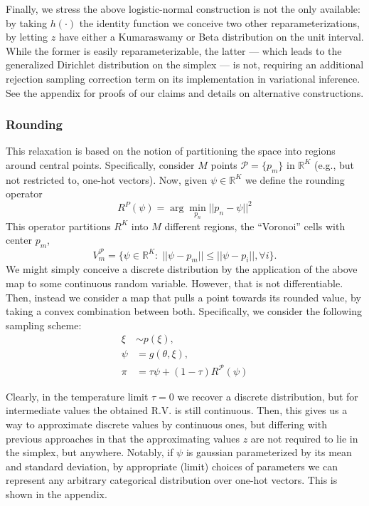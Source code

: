 \documentclass{article}
\begin{document}
Finally, we stress the above logistic-normal construction is not the only available: by taking $h(\cdot) $ the identity function we conceive two other reparameterizations, by letting $z$ have either a Kumaraswamy or Beta distribution on the unit interval. While the former is easily reparameterizable, the latter --- which leads to the generalized Dirichlet distribution on the simplex ---  is not, requiring an additional rejection sampling correction term on its implementation in variational inference.
See the appendix for proofs of our claims and details on alternative constructions.


\subsubsection{Rounding}
This relaxation is based on the notion of partitioning the space into regions around central points. Specifically,  consider $M$ points $\mathcal{P}=\{p_m\}$ in $\mathbb{R}^K$ (e.g., but not restricted to, one-hot vectors). Now, given $\psi\in\mathbb{R}^K$ we define the rounding operator $$R^{P}(\psi)=\arg\min_{p_n} ||p_n-\psi||^2$$
This operator partitions $R^K$ into $M$ different regions, the ``Voronoi'' cells with center $p_m$, 
\begin{equation}V^\mathcal{P}_{m}=\{\psi\in\mathbb{R}^K:\;||\psi-p_m||\leq ||\psi-p_i||,\forall i\}.\end{equation}
We might simply conceive a discrete distribution by the application of the above map to some continuous random variable. However, that is not differentiable. Then, instead we consider a map that pulls a point towards its rounded value, by taking a convex combination between both. Specifically, we consider the following sampling scheme:
\begin{align}
 \xi   &\sim p(\xi), \\
  \psi &= g(\theta, \xi), \\
  \pi &   =  \tau \psi + (1-\tau) R^\mathcal{P}(\psi) 
\end{align}

Clearly, in the temperature limit $\tau=0$ we recover a discrete distribution, but for intermediate values the obtained R.V. is still continuous. Then, this gives us a way to approximate discrete values by continuous ones, but differing with previous approaches in that the approximating values $z$ are not required to lie in the simplex, but anywhere. Notably, if $\psi$ is gaussian parameterized by its mean and standard deviation, by appropriate (limit) choices of parameters we can represent any arbitrary categorical distribution over one-hot vectors. This is shown in the appendix. 
 
\end{document}
